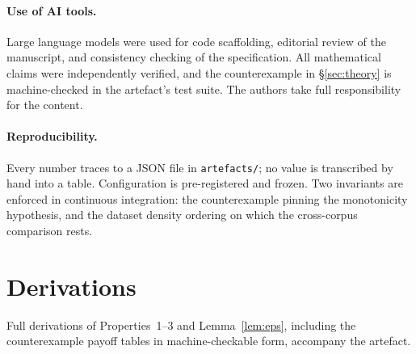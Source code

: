 \documentclass[11pt]{article}
\begin{document}
\paragraph{Use of AI tools.} Large language models were used for code
scaffolding, editorial review of the manuscript, and consistency checking of
the specification. All mathematical claims were independently verified, and the
counterexample in \S\ref{sec:theory} is machine-checked in the artefact's test
suite. The authors take full responsibility for the content.

\paragraph{Reproducibility.}\label{sec:repro} Every number traces to a JSON
file in \texttt{artefacts/}; no value is transcribed by hand into a table.
Configuration is pre-registered and frozen. Two invariants are enforced in
continuous integration: the counterexample pinning the monotonicity hypothesis,
and the dataset density ordering on which the cross-corpus comparison rests.




\appendix
\section{Derivations}
Full derivations of Properties~1--3 and Lemma~\ref{lem:eps}, including the
counterexample payoff tables in machine-checkable form, accompany the artefact.
\end{document}
